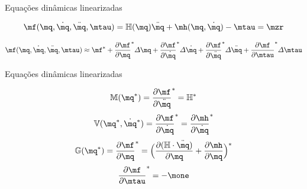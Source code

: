 \documentclass[25pt,landscape]{beamer}
\begin{document}
\begin{frame}{Equa\c{c}\~oes din\^amicas linearizadas}
    \begin{block}{}
		\begin{equation}
			\mf(\mq, \dot{\mq}, \ddot{\mq}, \mtau) = \mH(\mq) \ddot{\mq} + \mh(\mq, \dot{\mq}) - \mtau = \mzr
		\end{equation}

		\begin{equation}
			\mf(\mq, \dot{\mq}, \ddot{\mq}, \mtau) \approx  \mf^* + \frac{\partial \mf}{\partial \mq}^* \Delta \mq + \frac{\partial \mf}{\partial \dot{\mq}}^* \Delta \dot{\mq} + \frac{\partial \mf}{\partial \ddot{\mq}}^* \Delta \ddot{\mq} + \frac{\partial \mf}{\partial \mtau}^* \Delta \mtau
		\end{equation}
    \end{block}
\end{frame}

\begin{frame}{Equa\c{c}\~oes din\^amicas linearizadas}
    \begin{block}{}
    	\begin{equation} \label{eq:M}
			\mM(\mq^*) = \frac{\partial \mf}{\partial \ddot{\mq}}^*  = \mH^*
		\end{equation}
		\begin{equation} \label{eq:V}
			\mV(\mq^*, \dot{\mq}^*) =\frac{\partial \mf}{\partial \dot{\mq}}^* =  \frac{\partial \mh}{\partial \dot{\mq}}^*
		\end{equation}
		\begin{equation} \label{eq:G}
			\mG(\mq^*) = \frac{\partial \mf}{\partial \mq}^* = \Big( \frac{\partial (\mH \cdot \ddot{\mq})}{\partial \mq} + \frac{\partial \mh}{\partial \mq} \Big)^*
		\end{equation}
		\begin{equation}
			\frac{\partial \mf}{\partial \mtau}^* = -\mone
		\end{equation}
    \end{block}
\end{frame}
\end{document}
